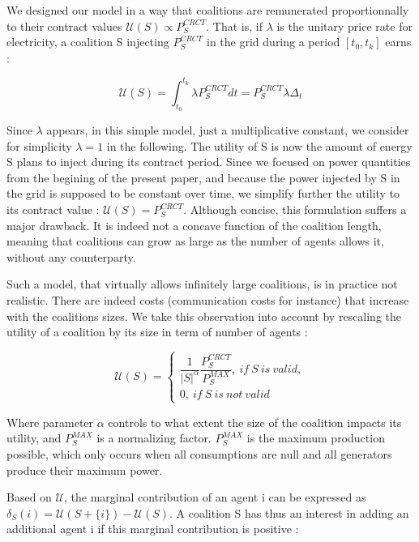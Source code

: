 \documentclass[conference]{IEEEtran}
\begin{document}
We designed our model in a way that coalitions are remunerated proportionnally to their contract values $ \mathcal{U}(S) \propto P_{S}^{CRCT} $. That is, if $ \lambda $ is the unitary price rate for electricity, a coalition S injecting $ P_{S}^{CRCT} $ in the grid during a period $ [t_{0},t_{k}] $ earns :

\begin{equation}
\mathcal{U}(S ) = \int_{t_{0}}^{t_{k}} \lambda P_{S}^{CRCT} dt = P_{S}^{CRCT} \lambda \Delta_{t}
\end{equation} 

Since $ \lambda $ appears, in this simple model, just a multiplicative constant, we consider for simplicity $ \lambda = 1 $ in the following. The utility of S is now the amount of energy S plans to inject during its contract period. Since we focused on power quantities from the begining of the present paper, and because the power injected by S in the grid is supposed to be constant over time, we simplify further the utility to its contract value : $ \mathcal{U}(S) = P_{S}^{CRCT} $. Although concise, this formulation suffers a major drawback. It is indeed not a concave function of the coalition length, meaning that coalitions can grow as large as the number of agents allows it, without any counterparty. 

Such a model, that virtually allows infinitely large coalitions, is in practice not realistic. There are indeed costs (communication costs for instance) that increase with the coalitions sizes. We take this observation into account by rescaling the utility of a coalition by its size in term of number of agents :

\begin{equation}
\mathcal{U}(S) = \left\{ \begin{array}{lll}
							\dfrac{1}{|S|^{\alpha}} \dfrac{ P_{S}^{CRCT} }{P_{S}^{MAX}},\ if\ S\ is\ valid, \\
							0,\ if\ S\ is\ not\ valid
						 \end{array}
				  \right.
\end{equation}

Where parameter $ \alpha $ controls to what extent the size of the coalition impacts its utility, and $ P_{S}^{MAX} $ is a normalizing factor. $ P_{S}^{MAX} $ is the maximum production possible, which only occurs when all consumptions are null and all generators produce their maximum power.

Based on $ \mathcal{U} $, the marginal contribution of an agent i can be expressed as $ \delta_{S}(i) = \mathcal{U}(S+\{i\}) - \mathcal{U}(S) $. A coalition S has thus an interest in adding an additional agent i if this marginal contribution is positive : 
\end{document}
